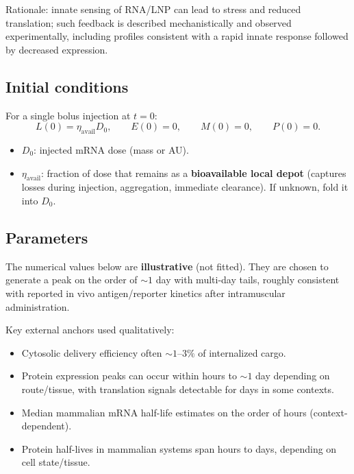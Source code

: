 Rationale: innate sensing of RNA/LNP can lead to stress and reduced translation; such feedback is described mechanistically and observed experimentally, including profiles consistent with a rapid innate response followed by decreased expression. \parencite{Nelson2020mRNAChemistryInnateImmunity}

\subsection*{Initial conditions}

For a single bolus injection at $t=0$:
\begin{equation}
L(0)=\eta_{\mathrm{avail}}D_0, \qquad E(0)=0, \qquad M(0)=0, \qquad P(0)=0.
\end{equation}

\begin{itemize}
    \item $D_0$: injected mRNA dose (mass or AU).
    \item $\eta_{\mathrm{avail}}$: fraction of dose that remains as a \textbf{bioavailable local depot} (captures losses during injection, aggregation, immediate clearance). If unknown, fold it into $D_0$.
\end{itemize}

\subsection*{Parameters}

The numerical values below are \textbf{illustrative} (not fitted). They are chosen to generate a peak on the order of $\sim 1$ day with multi-day tails, roughly consistent with reported in vivo antigen/reporter kinetics after intramuscular administration. \parencite{Hassett2024mRNAVaccineTrafficking}

Key external anchors used qualitatively:
\begin{itemize}
    \item Cytosolic delivery efficiency often $\sim 1$--$3\%$ of internalized cargo. \parencite{Pei2025EndosomalEscapeLNP}
    \item Protein expression peaks can occur within hours to $\sim 1$ day depending on route/tissue, with translation signals detectable for days in some contexts. \parencite{pardi2015expressionKinetics}
    \item Median mammalian mRNA half-life estimates on the order of hours (context-dependent). \parencite{Sharova2009mRNAHalfLifeESC}
    \item Protein half-lives in mammalian systems span hours to days, depending on cell state/tissue. \parencite{Toyama2013ProteinHomeostasis}
\end{itemize}

